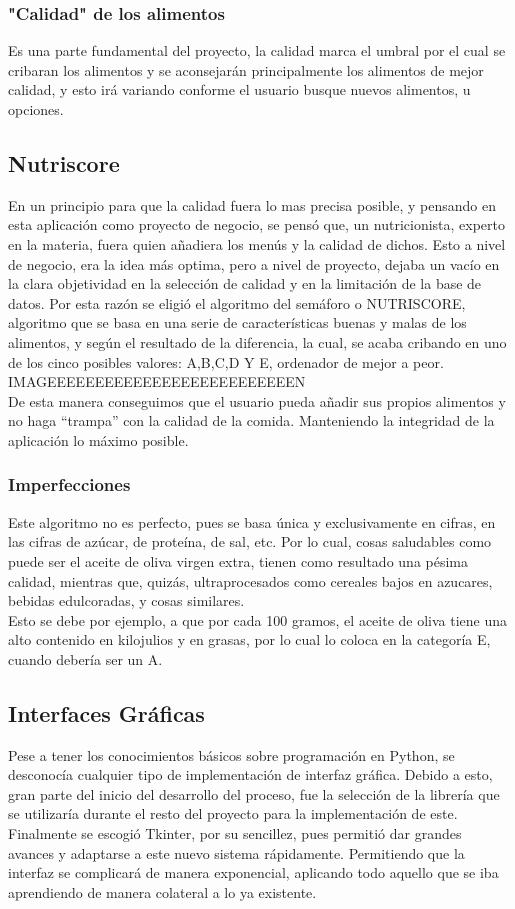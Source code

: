\subsubsection{"Calidad" de los alimentos}
Es una parte fundamental del proyecto, la calidad marca el umbral por el cual se cribaran los alimentos y se aconsejarán principalmente los alimentos de mejor calidad, y esto irá variando conforme el usuario busque nuevos alimentos, u opciones.
\subsection{Nutriscore}
En un principio para que la calidad fuera lo mas precisa posible, y pensando en esta aplicación como proyecto de negocio, se pensó que, un nutricionista, experto en la materia, fuera quien añadiera los menús y la calidad de dichos. Esto a nivel de negocio, era la idea más optima, pero a nivel de proyecto, dejaba un vacío en la clara objetividad en la selección de calidad y en la limitación de la base de datos. Por esta razón se eligió el algoritmo del semáforo o NUTRISCORE, algoritmo que se basa en una serie de características buenas y malas de los alimentos, y según el resultado de la diferencia, la cual, se acaba cribando en uno de los cinco posibles valores: A,B,C,D Y E, ordenador de mejor a peor.\\

IMAGEEEEEEEEEEEEEEEEEEEEEEEEEEN
\\
De esta manera conseguimos que el usuario pueda añadir sus propios alimentos y no haga “trampa” con la calidad de la comida. Manteniendo la integridad de la aplicación lo máximo posible.
\subsubsection{Imperfecciones}
Este algoritmo no es perfecto, pues se basa única y exclusivamente en cifras, en las cifras de azúcar, de proteína, de sal, etc. Por lo cual, cosas saludables como puede ser el aceite de oliva virgen extra, tienen como resultado una pésima calidad, mientras que, quizás, ultraprocesados como cereales bajos en azucares, bebidas edulcoradas, y cosas similares. \\
Esto se debe por ejemplo, a que por cada 100 gramos, el aceite de oliva tiene una alto contenido en kilojulios y en grasas, por lo cual lo coloca en la categoría E, cuando debería ser un A.
\subsection{Interfaces Gráficas}
Pese a tener los conocimientos básicos sobre programación en Python, se desconocía cualquier tipo de implementación de interfaz gráfica. Debido a esto, gran parte del inicio del desarrollo del proceso, fue la selección de la librería que se utilizaría durante el resto del proyecto para la implementación de este.\\
Finalmente se escogió Tkinter, por su sencillez, pues permitió dar grandes avances y adaptarse a este nuevo sistema rápidamente. Permitiendo que la interfaz se complicará de manera exponencial, aplicando todo aquello que se iba aprendiendo de manera colateral a lo ya existente.
